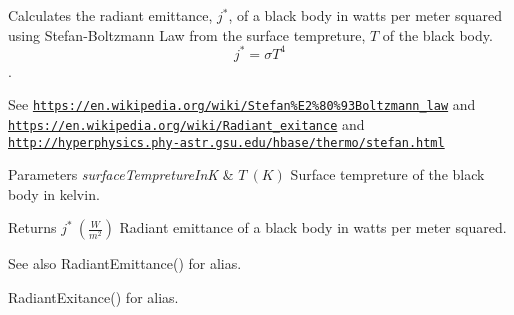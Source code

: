 Calculates the radiant emittance, $j^*$, of a black body in watts per meter squared using Stefan-\/\+Boltzmann Law from the surface tempreture, $T$ of the black body. \[j^*=\sigma T^4\]. 

See \href{https://en.wikipedia.org/wiki/Stefan%E2%80%93Boltzmann_law}{\tt https\+://en.\+wikipedia.\+org/wiki/\+Stefan\%\+E2\%80\%93\+Boltzmann\+\_\+law} and \href{https://en.wikipedia.org/wiki/Radiant_exitance}{\tt https\+://en.\+wikipedia.\+org/wiki/\+Radiant\+\_\+exitance} and \href{http://hyperphysics.phy-astr.gsu.edu/hbase/thermo/stefan.html}{\tt http\+://hyperphysics.\+phy-\/astr.\+gsu.\+edu/hbase/thermo/stefan.\+html}


\begin{DoxyParams}{Parameters}
{\em surface\+Tempreture\+InK} & $T\ (K)$ Surface tempreture of the black body in kelvin. \\
\hline
\end{DoxyParams}
\begin{DoxyReturn}{Returns}
$j^*\ (\frac{W}{m^2})$ Radiant emittance of a black body in watts per meter squared. 
\end{DoxyReturn}
\begin{DoxySeeAlso}{See also}
Radiant\+Emittance() for alias. 

Radiant\+Exitance() for alias. 
\end{DoxySeeAlso}
